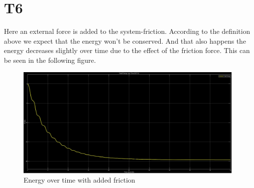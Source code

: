 \documentclass[12pt]{article}
\begin{document}
\newpage


\section{T6}

Here an external force is added to the system-friction. According to the definition above we expect that the energy won't be conserved. And that also happens the energy decreases slightly over time due to the effect of the friction force. This can be seen in the following figure.

\begin{figure}[H]
	\centering
	\includegraphics[scale=0.25]{energywithfriction}
	\caption{Energy over time with added friction}
\end{figure}
\end{document}
